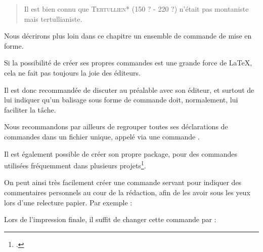 \begin{latexcode}
\newcommand{\auteur}[2]{\textsc{#1}* (#2)}
\end{latexcode}

\renewcommand{\auteur}[2]{\textsc{#1}* (#2)}

\begin{quotation}
Il est bien connu que \auteur{Tertullien}{150 ? - 220 ?}
n'était pas montaniste mais tertullianiste.
\end{quotation}

Nous décrirons plus loin dans ce chapitre un ensemble de commande de mise en forme.

\begin{attention}
    Si la possibilité de créer ses propres commandes est une grande force de \LaTeX, cela ne fait pas toujours la joie des éditeurs. 
    
    Il est donc recommandée de discuter au préalable avec son éditeur, et surtout de lui indiquer qu'un balisage sous forme de commande doit, normalement, lui faciliter la tâche.
    
    
    Nous recommandons par ailleurs de regrouper toutes ses déclarations de commandes dans un fichier unique, appelé via une commande .
    
    Il est également possible de créer son propre package, pour des commandes utilisées fréquemment dans plusieurs projets\footcite[Ceci dépasserais le cadre de cet ouvrage : je renvois à d'autres documents. Par exemples][]{creer_sty}.
\end{attention}


\begin{plusloins}\label{commentaireredac}
On peut ainsi très facilement créer une commande  servant pour indiquer des commentaires personnels au cour de la rédaction, afin de les avoir sous les yeux lors d'une relecture papier.
Par exemple :

\begin{latexcode}
\newcommand{\commentaire}[1]{\marginpar{#1}}
\end{latexcode}

Lors de l'impression finale, il suffit de changer cette commande par :

\begin{latexcode}
\newcommand{\commentaire}[1]{}
\end{latexcode}

\end{plusloins}

